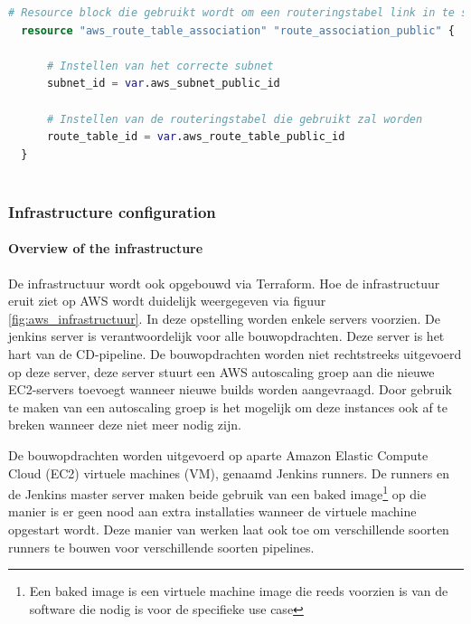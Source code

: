 \begin{lstlisting}[language=terraform]  
  # Resource block die gebruikt wordt om een routeringstabel link in te stellen
  resource "aws_route_table_association" "route_association_public" {
      
      # Instellen van het correcte subnet
      subnet_id = var.aws_subnet_public_id
  
      # Instellen van de routeringstabel die gebruikt zal worden
      route_table_id = var.aws_route_table_public_id
  }
  
\end{lstlisting}

\subsubsection{
{Infrastructure configuration}}
\label{sec:Infrastructuur configuratie}

\paragraph{
{Overview of the infrastructure}}
\label{sec:Infrastructuur overzicht}

De infrastructuur wordt ook opgebouwd via Terraform. Hoe de infrastructuur eruit ziet op AWS wordt duidelijk weergegeven via figuur \ref{fig:aws_infrastructuur}. In deze opstelling worden enkele servers voorzien. De jenkins server is verantwoordelijk voor alle bouwopdrachten. Deze server is het hart van de CD-pipeline. De bouwopdrachten worden niet rechtstreeks uitgevoerd op deze server, deze server stuurt een AWS autoscaling groep aan die nieuwe EC2-servers toevoegt wanneer nieuwe builds worden aangevraagd. Door gebruik te maken van een autoscaling groep is het mogelijk om deze instances ook af te breken wanneer deze niet meer nodig zijn. 
\newline

De bouwopdrachten worden uitgevoerd op aparte Amazon Elastic Compute Cloud (EC2) virtuele machines (VM), genaamd Jenkins runners. De runners en de Jenkins master server maken beide gebruik van een baked image\footnote{ Een baked image is een virtuele machine image die reeds voorzien is van de software die nodig is voor de specifieke use case} op die manier is er geen nood aan extra installaties wanneer de virtuele machine opgestart wordt. Deze manier van werken laat ook toe om verschillende soorten runners te bouwen voor verschillende soorten pipelines.
\newline 


